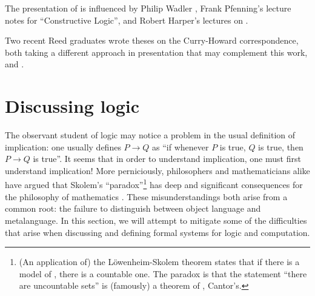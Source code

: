 \documentclass[12pt,twoside]{reedthesis}
\let\oldindex\index
\renewcommand{\index}[1]
               {\oldindex{#1}\marginpar{\footnotesize\color{index}index: #1}}
\newcommand{\TODO}[1]{\marginpar{\footnotesize\color{TODO}todo: #1}}
\newcommand{\define}[1]{\textbf{#1}} %
\newtheorem{notation}[theorem]{Notation}
\begin{document}
The presentation of  is influenced by
Philip Wadler \cite{wadler-propositions}, Frank Pfenning's lecture notes for
``Constructive Logic'', and Robert Harper's lectures on
\HoTT.\TODO{citation}

Two recent Reed graduates wrote theses on the Curry-Howard correspondence, both
taking a different approach in presentation that may complement this work,
\cite{curry-howard-reed-thesis} and \cite{process-calculi-reed-thesis}.


\section{Discussing logic}
\label{sec:discussing-logic}

The observant student of logic may notice a problem in the usual definition of
implication: one usually defines $P→ Q$ as ``if whenever $P$ is true,
$Q$ is true, then $P→ Q$ is true''. It seems that in order to understand
implication, one must first understand implication! More perniciously,
philosophers and mathematicians alike have argued that Skolem's
``paradox''\footnote{(An application of) the L\"owenheim-Skolem theorem states
  that if there is a model of \ZFC, there is a countable one.
  The paradox is that the statement ``there are uncountable sets'' is (famously)
  a theorem of \ZFC, Cantor's.}
has deep and significant consequences for the philosophy of
mathematics \cite{skolem}. These misunderstandings both arise from a common
root: the failure to distinguish between object language and metalanguage. In
this section, we will attempt to mitigate some of the difficulties that arise
when discussing and defining formal systems for logic and computation.

\end{document}

